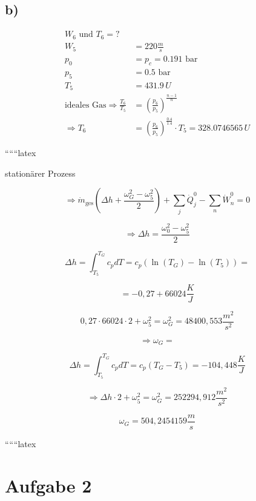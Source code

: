 

\subsection*{b)}

\begin{align*}
    W_6 \text{ und } T_6 = ? \\
    W_5 &= 220 \frac{m}{s} \\
    p_0 &= p_c = 0.191 \text{ bar} \\
    p_5 &= 0.5 \text{ bar} \\
    T_5 &= 431.9 \, U \\
    \text{ideales Gas} \Rightarrow \frac{T_6}{T_5} &= \left( \frac{p_6}{p_5} \right)^{\frac{n-1}{n}} \\
    \Rightarrow T_6 &= \left( \frac{p_6}{p_5} \right)^{\frac{0.4}{1.4}} \cdot T_5 = 328.0746565 \, U
\end{align*}

``````latex

stationärer Prozess

\[
\Rightarrow \dot{m}_{\text{ges}} (\Delta h + \frac{\omega_G^2 - \omega_5^2}{2}) + \sum_j \dot{Q}_j^0 - \sum_n \dot{W}_n^0 = 0
\]

\[
\Rightarrow \Delta h = \frac{\omega_0^2 - \omega_5^2}{2}
\]

\[
\Delta h = \int_{T_5}^{T_G} c_p dT = c_p ( \ln(T_G) - \ln(T_5) ) = 
\]

\[
= -0,27 + 66024 \frac{K}{J}
\]

\[
0,27 \cdot 66024 \cdot 2 + \omega_5^2 = \omega_G^2 = 48400,553 \frac{m^2}{s^2}
\]

\[
\Rightarrow \omega_G = 
\]

\[
\Delta h = \int_{T_5}^{T_G} c_p dT = c_p ( T_G - T_5 ) = -104,448 \frac{K}{J}
\]

\[
\Rightarrow \Delta h \cdot 2 + \omega_5^2 = \omega_G^2 = 252294,912 \frac{m^2}{s^2}
\]

\[
\omega_G = 504,2454159 \frac{m}{s}
\]

``````latex

\section*{Aufgabe 2}